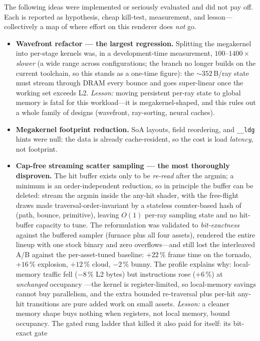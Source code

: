 The following ideas were implemented or seriously evaluated and did not pay off. Each is reported as
hypothesis, cheap kill-test, measurement, and lesson---collectively a map of where effort on this
renderer does \emph{not} go.

\begin{itemize}
  \item \textbf{Wavefront refactor --- the largest regression.} Splitting the megakernel into per-stage
  kernels was, in a development-time measurement, $100$--$1400\times$ \emph{slower} (a wide range across
  configurations; the branch no longer builds on the current toolchain, so this stands as a one-time
  figure): the ${\sim}352$\,B/ray state must stream through DRAM
  every bounce and goes super-linear once the working set exceeds L2. \emph{Lesson:} moving persistent
  per-ray state to global memory is fatal for this workload---it is megakernel-shaped, and this rules
  out a whole family of designs (wavefront, ray-sorting, neural caches).
  \item \textbf{Megakernel footprint reduction.} SoA layouts, field reordering, and
  \texttt{\_\_ldg} hints were null: the data is already cache-resident, so the cost is load
  \emph{latency}, not footprint.
  \item \textbf{Cap-free streaming scatter sampling --- the most thoroughly disproven.} The hit buffer
  exists only to be \emph{re-read} after the argmin; a minimum is an order-independent reduction, so
  in principle the buffer can be deleted: stream the argmin inside the any-hit shader, with the
  free-flight draws made traversal-order-invariant by a stateless counter-based hash of (path, bounce,
  primitive), leaving $O(1)$ per-ray sampling state and no hit-buffer capacity to tune. The
  reformulation was validated to \emph{bit-exactness} against the buffered sampler (furnace plus all
  four assets), rendered the entire lineup with one stock binary and zero overflows---and still lost
  the interleaved A/B against the per-asset-tuned baseline: $+22\,\%$ frame time on the tornado,
  $+16\,\%$ explosion, $+12\,\%$ cloud, $-2\,\%$ bunny. The profile explains why: local-memory
  traffic fell ($-8\,\%$ L2 bytes) but instructions rose ($+6\,\%$) at \emph{unchanged} occupancy
  ---the kernel is register-limited, so local-memory savings cannot buy parallelism, and the extra
  bounded re-traversal plus per-hit any-hit transitions are pure added work on small assets.
  \emph{Lesson:} a cleaner memory shape buys nothing when registers, not local memory, bound
  occupancy. The gated rung ladder that killed it also paid for itself: its bit-exact gate

\end{itemize}
